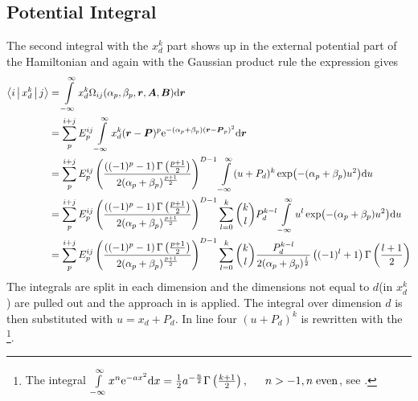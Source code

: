 \subsection{Potential Integral}
    The second integral with the $x^k_d$ part shows up in the external
    potential part of the Hamiltonian and again with the Gaussian product rule
    the expression gives
        \begin{align}
            \Braket{i|x^k_d|j} &= \int\limits^{\infty}_{-\infty} x^{k}_d
            \Omega_{ij}(\alpha_p,\beta_p,\boldsymbol{{r}},\boldsymbol{{A}},\boldsymbol{{B}}) \mathrm{d}
            \boldsymbol{{r}} \nonumber \\
            &= \sum\limits^{i+j}_{p} E^{ij}_{p} \int\limits^{\infty}_{-\infty} x^k_d (\boldsymbol{{r}}-\boldsymbol{{P}})^p
            \mathrm{e}^{-(\alpha_p+\beta_p)(\boldsymbol{{r}} - \boldsymbol{{P}}_p)^2} \mathrm{d} \boldsymbol{{r}}
            \nonumber \\
            &= \sum\limits^{i+j}_{p} E^{ij}_{p}
            \left(\frac{\left((-1)^p-1\right)\Gamma\left(\frac{p+1}{2}\right)}
            {2(\alpha_p+\beta_p)^{\frac{p+1}{2}}}\right)^{D-1} \int\limits^{\infty}_{-\infty}
            (u+P_d)^k\exp(-(\alpha_p+\beta_p)u^2) \mathrm{d} u \nonumber \\
            &= \sum\limits^{i+j}_{p} E^{ij}_{p}
            \left(\frac{\left((-1)^p-1\right)\Gamma\left(\frac{p+1}{2}\right)}
            {2(\alpha_p+\beta_p)^{\frac{p+1}{2}}}\right)^{D-1}
            \sum\limits_{l=0}^k {k\choose l} P^{k-l}_d \int\limits^{\infty}_{-\infty}
            u^l\exp(-(\alpha_p+\beta_p)u^2) \mathrm{d} u \nonumber \\
            &= \sum\limits^{i+j}_{p} E^{ij}_{p}
            \left(\frac{\left((-1)^p-1\right)\Gamma\left(\frac{p+1}{2}\right)}
            {2(\alpha_p+\beta_p)^{\frac{p+1}{2}}}\right)^{D-1}
            \sum\limits_{l=0}^k {k\choose l}
            \frac{P^{k-l}_d}{2(\alpha_p+\beta_p)^{\frac{l}{2}}}
            \left((-1)^l+1\right) \Gamma\left(\frac{l+1}{2}\right)
            \label{eq:potIntegral}
        \end{align}
    The integrals are split in each dimension and the dimensions not equal to
    $d$(in $x^k_d$) are pulled out and the approach in  is
    applied. The integral over dimension $d$ is then substituted with
    $u=x_d+P_d$. In line four $(u+P_d)^k$ is rewritten with the \footnote{The integral $\infint x^n\me^{-ax^2}\md x =
    \frac{1}{2}a^{-\frac{n}{2}}\Gamma\left(\frac{k+1}{2}\right),\indent n>-1,
    n\;\text{even}$, see \cite{handbookmath}.}.

